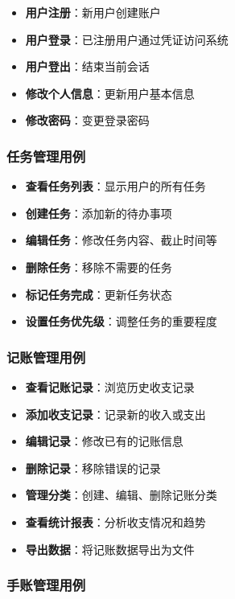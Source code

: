 \documentclass[a4paper]{article}
\begin{document}
\begin{itemize}
    \item \textbf{用户注册}：新用户创建账户
    \item \textbf{用户登录}：已注册用户通过凭证访问系统
    \item \textbf{用户登出}：结束当前会话
    \item \textbf{修改个人信息}：更新用户基本信息
    \item \textbf{修改密码}：变更登录密码
\end{itemize}

\subsubsection{任务管理用例}

\begin{itemize}
    \item \textbf{查看任务列表}：显示用户的所有任务
    \item \textbf{创建任务}：添加新的待办事项
    \item \textbf{编辑任务}：修改任务内容、截止时间等
    \item \textbf{删除任务}：移除不需要的任务
    \item \textbf{标记任务完成}：更新任务状态
    \item \textbf{设置任务优先级}：调整任务的重要程度
\end{itemize}

\subsubsection{记账管理用例}

\begin{itemize}
    \item \textbf{查看记账记录}：浏览历史收支记录
    \item \textbf{添加收支记录}：记录新的收入或支出
    \item \textbf{编辑记录}：修改已有的记账信息
    \item \textbf{删除记录}：移除错误的记录
    \item \textbf{管理分类}：创建、编辑、删除记账分类
    \item \textbf{查看统计报表}：分析收支情况和趋势
    \item \textbf{导出数据}：将记账数据导出为文件
\end{itemize}

\subsubsection{手账管理用例}
\end{document}
